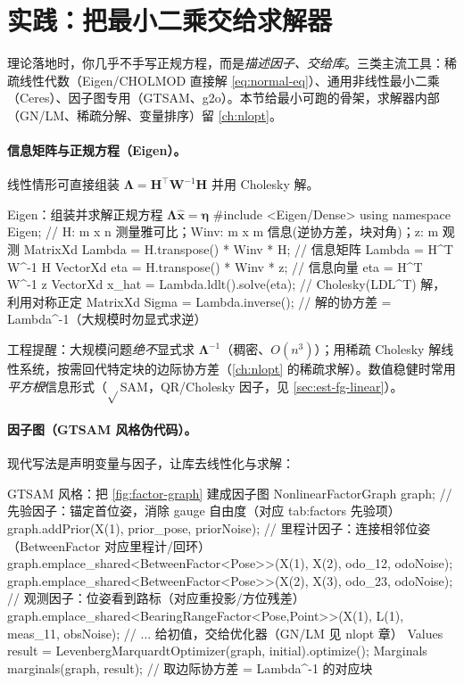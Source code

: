 \section{实践：把最小二乘交给求解器}
\label{sec:est-practice}

理论落地时，你几乎不手写正规方程，而是\emph{描述因子、交给库}。三类主流工具：稀疏线性代数（Eigen/CHOLMOD 直接解 \cref{eq:normal-eq}）、通用非线性最小二乘（Ceres）、因子图专用（GTSAM、g2o）。本节给最小可跑的骨架，求解器内部（GN/LM、稀疏分解、变量排序）留 \cref{ch:nlopt}。

\paragraph{信息矩阵与正规方程（Eigen）。}
线性情形可直接组装 $\boldsymbol{\Lambda}=\mathbf{H}^\top\mathbf{W}^{-1}\mathbf{H}$ 并用 Cholesky 解。

\begin{codebox}[C++]{Eigen：组装并求解正规方程 $\boldsymbol{\Lambda}\hat{\mathbf{x}}=\boldsymbol{\eta}$}
#include <Eigen/Dense>
using namespace Eigen;
// H: m x n 测量雅可比；Winv: m x m 信息(逆协方差，块对角)；z: m 观测
MatrixXd Lambda = H.transpose() * Winv * H;   // 信息矩阵 Lambda = H^T W^-1 H
VectorXd eta    = H.transpose() * Winv * z;    // 信息向量 eta = H^T W^-1 z
VectorXd x_hat  = Lambda.ldlt().solve(eta);    // Cholesky(LDL^T) 解，利用对称正定
MatrixXd Sigma  = Lambda.inverse();            // 解的协方差 = Lambda^-1（大规模时勿显式求逆）
\end{codebox}

\noindent 工程提醒：大规模问题\emph{绝不}显式求 $\boldsymbol{\Lambda}^{-1}$（稠密、$O(n^3)$）；用稀疏 Cholesky 解线性系统，按需回代特定块的边际协方差（\cref{ch:nlopt} 的稀疏求解）。数值稳健时常用\emph{平方根}信息形式（$\sqrt{}$SAM，QR/Cholesky 因子，见 \cref{sec:est-fg-linear}）。

\paragraph{因子图（GTSAM 风格伪代码）。}
现代写法是声明变量与因子，让库去线性化与求解：

\begin{codebox}[C++]{GTSAM 风格：把 \cref{fig:factor-graph} 建成因子图}
NonlinearFactorGraph graph;
// 先验因子：锚定首位姿，消除 gauge 自由度（对应 tab:factors 先验项）
graph.addPrior(X(1), prior_pose, priorNoise);
// 里程计因子：连接相邻位姿（BetweenFactor 对应里程计/回环）
graph.emplace_shared<BetweenFactor<Pose>>(X(1), X(2), odo_12, odoNoise);
graph.emplace_shared<BetweenFactor<Pose>>(X(2), X(3), odo_23, odoNoise);
// 观测因子：位姿看到路标（对应重投影/方位残差）
graph.emplace_shared<BearingRangeFactor<Pose,Point>>(X(1), L(1), meas_11, obsNoise);
// ... 给初值，交给优化器（GN/LM 见 nlopt 章）
Values result = LevenbergMarquardtOptimizer(graph, initial).optimize();
Marginals marginals(graph, result);   // 取边际协方差 = Lambda^-1 的对应块
\end{codebox}


